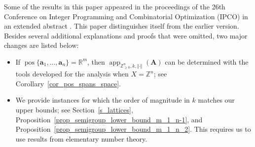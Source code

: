 \documentclass[pdflatex]{sn-jnl}
\DeclareMathOperator{\app}{app}
\DeclareMathOperator{\pos}{pos}
\newcommand{\R}{\mathbb{R}}
\newcommand{\Z}{\mathbb{Z}}
\newcommand{\bA}{\bm{A}}
\newcommand{\ba}{\bm{a}}
\theoremstyle{thmstyleone}%
\theoremstyle{thmstyletwo}%
\theoremstyle{thmstylethree}%
\begin{document}
	Some of the results in this paper appeared in the proceedings of the 26th Conference on Integer Programming and Combinatorial Optimization (IPCO) in an extended abstract \cite{ipco_version}. 
	This paper distinguishes itself from the earlier version. 
	Besides several additional explanations and proofs that were omitted, 
	two major changes are listed below:
	\begin{itemize}
		\item[(a)] If $\pos\lbrace \ba_1,\ldots,\ba_n\rbrace = \R^m$, then $\app_{\Z_{\geq 0}^n,k,\Vert\cdot\Vert }(\bA)$ can be determined with the tools developed for the analysis when $X=\Z^n$; see Corollary~\ref{cor_pos_spans_space}.
		\item[(b)] We provide instances for which the order of magnitude in $k$ matches our upper bounds; see Section~\ref{s_lattices}, Proposition~\ref{prop_semigroup_lower_bound_m_1_n-1}, and Proposition~\ref{prop_semigroup_lower_bound_m_1_n_2}. 
		This requires us to use results from elementary number theory. 
	\end{itemize}
	
\end{document}

